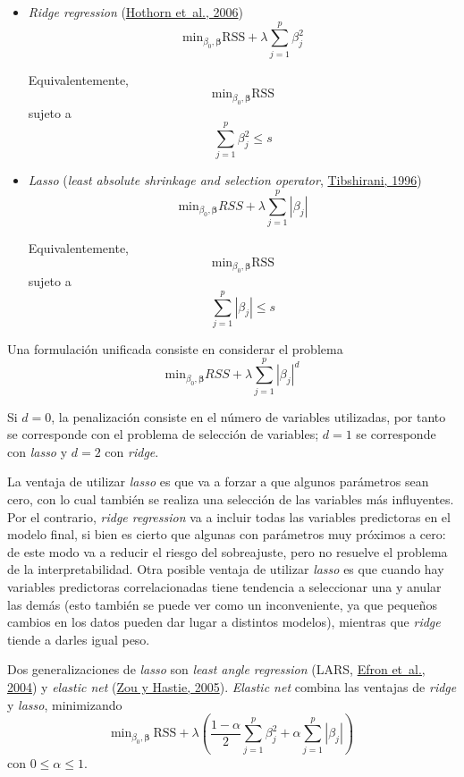 \documentclass[
  spanish,
]{book}
\theoremstyle{break}
\theoremstyle{definition}
\theoremstyle{definition}
\theoremstyle{definition}
\theoremstyle{definition}
\theoremstyle{remark}
\begin{document}
\begin{itemize}
\item
  \emph{Ridge regression} (\protect\hyperlink{ref-hothorn2006unbiased}{Hothorn et~al., 2006})
  \[\mbox{min}_{\beta_0, \boldsymbol{\beta}} \mbox{RSS} + \lambda\sum_{j=1}^{p}\beta_{j}^{2}\]

  Equivalentemente,
  \[\mbox{min}_{\beta_0, \boldsymbol{\beta}} \mbox{RSS}\]
  sujeto a
  \[\sum_{j=1}^{p}\beta_{j}^{2} \le s\]
\item
  \emph{Lasso} (\emph{least absolute shrinkage and selection operator}, \protect\hyperlink{ref-tibshirani1996regression}{Tibshirani, 1996})
  \[\mbox{min}_{\beta_0, \boldsymbol{\beta}} RSS + \lambda\sum_{j=1}^{p}|\beta_{j}|\]

  Equivalentemente,
  \[\mbox{min}_{\beta_0, \boldsymbol{\beta}} \mbox{RSS}\]
  sujeto a
  \[\sum_{j=1}^{p}|\beta_{j}| \le s\]
\end{itemize}

Una formulación unificada consiste en considerar el problema
\[\mbox{min}_{\beta_0, \boldsymbol{\beta}} RSS + \lambda\sum_{j=1}^{p}|\beta_{j}|^d\]

Si \(d=0\), la penalización consiste en el número de variables utilizadas, por tanto se corresponde con el problema de selección de variables; \(d=1\) se corresponde con \emph{lasso} y \(d=2\) con \emph{ridge}.

La ventaja de utilizar \emph{lasso} es que va a forzar a que algunos parámetros sean cero, con lo cual también se realiza una selección de las variables más influyentes.
Por el contrario, \emph{ridge regression} va a incluir todas las variables predictoras en el modelo final, si bien es cierto que algunas con parámetros muy próximos a cero: de este modo va a reducir el riesgo del sobreajuste, pero no resuelve el problema de la interpretabilidad.
Otra posible ventaja de utilizar \emph{lasso} es que cuando hay variables predictoras correlacionadas tiene tendencia a seleccionar una y anular las demás (esto también se puede ver como un inconveniente, ya que pequeños cambios en los datos pueden dar lugar a distintos modelos), mientras que \emph{ridge} tiende a darles igual peso.

Dos generalizaciones de \emph{lasso} son \emph{least angle regression} (LARS, \protect\hyperlink{ref-efron2004least}{Efron et~al., 2004}) y \emph{elastic net} (\protect\hyperlink{ref-zou2005regularization}{Zou y Hastie, 2005}).
\emph{Elastic net} combina las ventajas de \emph{ridge} y \emph{lasso}, minimizando
\[\mbox{min}_{\beta_0, \boldsymbol{\beta}} \ \mbox{RSS} + \lambda \left( \frac{1 - \alpha}{2}\sum_{j=1}^{p}\beta_{j}^{2} + \alpha \sum_{j=1}^{p}|\beta_{j}| \right)\]
con \(0 \leq \alpha \leq 1\).
\end{document}

